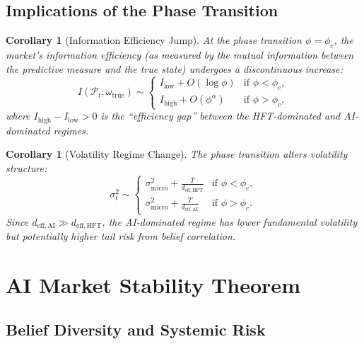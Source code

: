 \documentclass[12pt,a4paper]{article}
\newtheorem{corollary}[theorem]{Corollary}
\theoremstyle{definition}
\newcommand{\PP}{\mathcal{P}}
\begin{document}
\subsection{Implications of the Phase Transition}

\begin{corollary}[Information Efficiency Jump]\label{cor:efficiency-jump}
At the phase transition $\phi = \phi_c$, the market's information efficiency (as measured by the mutual information between the predictive measure and the true state) undergoes a discontinuous increase:
\begin{equation}
  I(\PP_t; \omega_{\mathrm{true}}) \sim \begin{cases}
    I_{\mathrm{low}} + O(\log \phi) & \text{if } \phi < \phi_c, \\
    I_{\mathrm{high}} + O(\phi^\alpha) & \text{if } \phi > \phi_c,
  \end{cases}
\end{equation}
where $I_{\mathrm{high}} - I_{\mathrm{low}} > 0$ is the ``efficiency gap'' between the HFT-dominated and AI-dominated regimes.
\end{corollary}

\begin{corollary}[Volatility Regime Change]\label{cor:volatility}
The phase transition alters volatility structure:
\begin{equation}
  \sigma_t^2 \sim \begin{cases}
    \sigma_{\mathrm{micro}}^2 + \frac{T}{d_{\mathrm{eff,HFT}}} & \text{if } \phi < \phi_c, \\
    \sigma_{\mathrm{micro}}^2 + \frac{T}{d_{\mathrm{eff,AI}}} & \text{if } \phi > \phi_c.
  \end{cases}
\end{equation}
Since $d_{\mathrm{eff,AI}} \gg d_{\mathrm{eff,HFT}}$, the AI-dominated regime has \emph{lower} fundamental volatility but potentially higher tail risk from belief correlation.
\end{corollary}

\section{AI Market Stability Theorem}\label{sec:stability}

\subsection{Belief Diversity and Systemic Risk}
\end{document}

